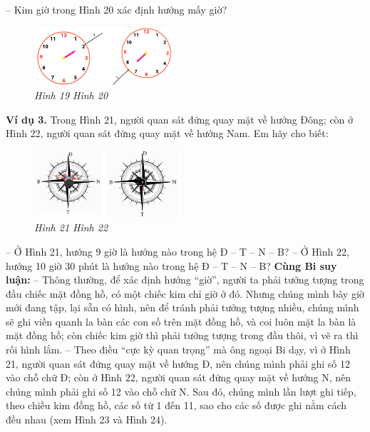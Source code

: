 	\vskip 0.05cm
	-- Kim giờ trong Hình 20 xác định hướng  mấy giờ?
		\begin{figure}[H]
		\centering
		\vspace*{-5pt}
		\captionsetup{labelformat= empty, justification=centering}
		\includegraphics[width=0.465\textwidth]{pic17}
		\caption{\small\textit{Hình 19 \hspace*{80pt} Hình 20}}
		\vspace*{-10pt}
	\end{figure}
	\textbf{Ví dụ 3.} Trong Hình 21, người quan sát đứng quay mặt về hướng Đông; còn ở Hình 22, người quan sát đứng quay mặt về hướng Nam. Em hãy cho biết:
			\begin{figure}[H]
		\centering
		\vspace*{-5pt}
		\captionsetup{labelformat= empty, justification=centering}
		\includegraphics[width=0.48\textwidth]{pic18}
		\caption{\small\textit{Hình 21 \hspace*{80pt} Hình 22}}
		\vspace*{-5pt}
	\end{figure}
	-- Ở Hình 21, hướng 9 giờ là hướng nào trong hệ Đ -- T -- N -- B?
	\vskip 0.05cm
	-- Ở Hình 22, hướng 10 giờ 30 phút là hướng nào trong hệ Đ -- T -- N -- B?
	\vskip 0.05cm
	\textbf{Cùng Bi suy luận:}
	\vskip 0.1cm
	-- Thông thường, để xác định hướng “giờ”, người ta phải tưởng tượng trong đầu chiếc mặt đồng hồ, có một chiếc kim chỉ giờ ở đó. Nhưng chúng mình bây giờ mới đang tập, lại sẵn có hình, nên để tránh phải tưởng tượng nhiều, chúng mình sẽ ghi viền quanh la bàn các con số trên mặt đồng hồ, và coi luôn mặt la bàn là mặt đồng hồ; còn chiếc kim giờ thì phải tưởng tượng trong đầu thôi, vì vẽ ra thì rối hình lắm.
	\vskip 0.1cm
	-- Theo điều “cực kỳ quan trọng” mà ông ngoại Bi dạy, vì ở Hình 21, người quan sát đứng quay mặt về hướng Đ, nên chúng mình phải ghi số 12 vào chỗ chữ Đ; còn ở Hình 22, người quan sát đứng quay mặt về hướng N, nên chúng mình phải ghi số 12 vào chỗ chữ N. Sau đó, chúng mình lần lượt ghi tiếp, theo chiều kim đồng hồ, các số từ 1 đến 11, sao cho các số được ghi nằm cách đều nhau (xem Hình 23 và Hình 24).
